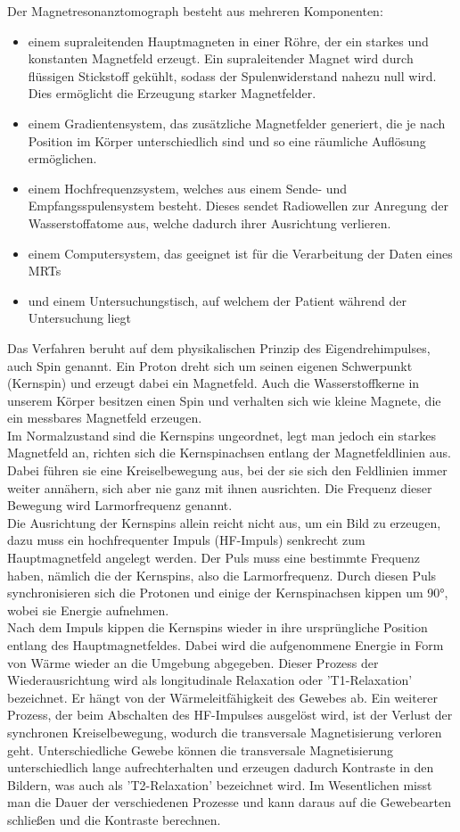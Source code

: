 Der Magnetresonanztomograph besteht aus mehreren Komponenten: 
\begin{itemize}
	\item einem supraleitenden Hauptmagneten in einer Röhre, der ein starkes und konstanten Magnetfeld erzeugt. Ein supraleitender Magnet wird durch flüssigen Stickstoff gekühlt, sodass der Spulenwiderstand nahezu null wird. Dies ermöglicht die Erzeugung starker Magnetfelder.
	\item einem Gradientensystem, das zusätzliche Magnetfelder generiert, die je nach Position im Körper unterschiedlich sind und so eine räumliche Auflösung ermöglichen.
	\item einem Hochfrequenzsystem, welches aus einem Sende- und Empfangsspulensystem besteht. Dieses sendet Radiowellen zur Anregung der Wasserstoffatome aus, welche dadurch ihrer Ausrichtung verlieren.
	\item einem Computersystem, das geeignet ist für die Verarbeitung der Daten eines \ac{MRT}s
	\item und einem Untersuchungstisch, auf welchem der Patient während der Untersuchung liegt
\end{itemize}
Das Verfahren beruht auf dem physikalischen Prinzip des Eigendrehimpulses, auch Spin genannt. Ein \gls{Proton} dreht sich um seinen eigenen Schwerpunkt (Kernspin) und erzeugt dabei ein Magnetfeld. Auch die Wasserstoffkerne in unserem Körper besitzen einen Spin und verhalten sich wie kleine Magnete, die ein messbares Magnetfeld erzeugen.\\
Im Normalzustand sind die Kernspins ungeordnet, legt man jedoch ein starkes Magnetfeld an, richten sich die Kernspinachsen entlang der Magnetfeldlinien aus. Dabei führen sie eine Kreiselbewegung aus, bei der sie sich den Feldlinien immer weiter annähern, sich aber nie ganz mit ihnen ausrichten. Die Frequenz dieser Bewegung wird Larmorfrequenz genannt.\\ 
Die Ausrichtung der Kernspins allein reicht nicht aus, um ein Bild zu erzeugen, dazu muss ein hochfrequenter Impuls (HF-Impuls) senkrecht zum Hauptmagnetfeld angelegt werden. Der Puls muss eine bestimmte Frequenz haben, nämlich die der Kernspins, also die Larmorfrequenz. Durch diesen Puls synchronisieren sich die Protonen und einige der Kernspinachsen kippen um 90°, wobei sie Energie aufnehmen.\cite[vgl.][]{ChristophPabst2013}\\
Nach dem Impuls kippen die Kernspins wieder in ihre ursprüngliche Position entlang des Hauptmagnetfeldes. Dabei wird die aufgenommene Energie in Form von Wärme wieder an die Umgebung abgegeben. Dieser Prozess der Wiederausrichtung wird als longitudinale Relaxation oder 'T1-Relaxation' bezeichnet. Er hängt von der Wärmeleitfähigkeit des Gewebes ab. Ein weiterer Prozess, der beim Abschalten des HF-Impulses ausgelöst wird, ist der Verlust der synchronen Kreiselbewegung, wodurch die transversale Magnetisierung verloren geht. Unterschiedliche Gewebe können die transversale Magnetisierung unterschiedlich lange aufrechterhalten und erzeugen dadurch Kontraste in den Bildern, was auch als 'T2-Relaxation' bezeichnet wird. Im Wesentlichen misst man die Dauer der verschiedenen Prozesse und kann daraus auf die Gewebearten schließen und die Kontraste berechnen.\cite[vgl.][]{Kernspin2022}

